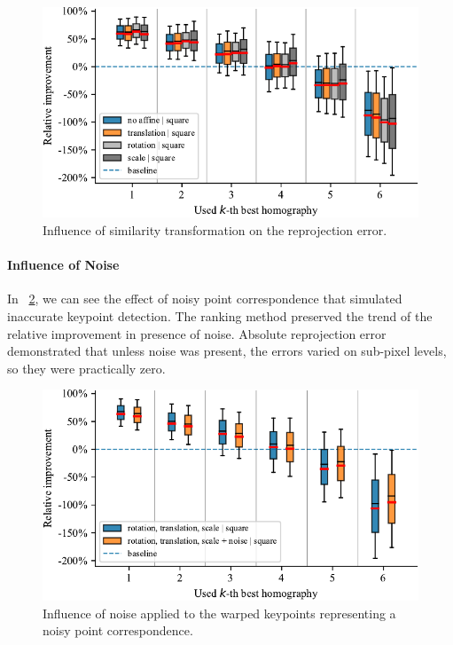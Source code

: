 \begin{figure}[t]
    \centering
    \includegraphics[width=\boxplotimgwidth]{figures/homography/similarity_transform_influence.pdf}
    \caption[Influence of similarity transformation]{Influence of similarity transformation on the reprojection error.}
    \label{fig:SimilarityTransformInfluence}
\end{figure}

\paragraph{Influence of Noise}
In \figstr{}~\ref{fig:NoiseInfluence}, we can see the effect of noisy point correspondence that simulated inaccurate keypoint detection. The ranking method preserved the trend of the relative improvement in presence of noise. Absolute reprojection error demonstrated that unless noise was present, the errors varied on sub-pixel levels, so they were practically zero.

\begin{figure}[t]
    \centering
    \includegraphics[width=\boxplotimgwidth]{figures/homography/noise_influence.pdf}
    \caption[Influence of noise]{Influence of noise applied to the warped keypoints representing a noisy point correspondence.}
    \label{fig:NoiseInfluence}
\end{figure}

